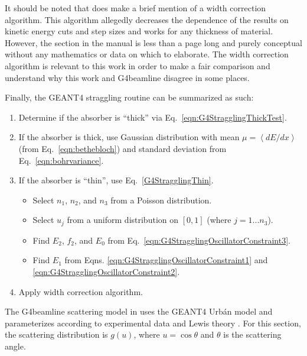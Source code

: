 It should be noted that \cite{geant4} does make a brief mention of a width correction algorithm. This algorithm allegedly decreases the dependence of the results on kinetic energy cuts and step sizes and works for any thickness of material. However, the section in the manual is less than a page long and purely conceptual without any mathematics or data on which to elaborate. The width correction algorithm is relevant to this work in order to make a fair comparison and understand why this work and G4beamline disagree in some places.

Finally, the GEANT4 straggling routine can be summarized as such:
\begin{enumerate}
\item{Determine if the absorber is ``thick'' via Eq.~\eqref{eqn:G4StragglingThickTest}.}
\item{If the absorber is thick, use Gaussian distribution with mean $\mu = \left<dE/dx\right>$ (from Eq.~\eqref{eqn:bethebloch}) and standard deviation from Eq.~\eqref{eqn:bohrvariance}.}
\item{If the absorber is ``thin'', use Eq.~\eqref{G4StragglingThin}.
	\begin{itemize}
	\item{Select $n_1$, $n_2$, and $n_3$ from a Poisson distribution.}
	\item{Select $u_j$ from a uniform distribution on $[0,1]$ (where $j=1...n_3$).}
	\item{Find $E_2$, $f_2$, and $E_0$ from Eq.~\eqref{eqn:G4StragglingOscillatorConstraint3}.} 
	\item{Find $E_1$ from Eqns. \ref{eqn:G4StragglingOscillatorConstraint1} and \ref{eqn:G4StragglingOscillatorConstraint2}.}
	\end{itemize}
	}
\item{Apply width correction algorithm.}
\end{enumerate}
 \label{sec:g4blscattering}\par
The G4beamline scattering model in \cite{g4bl} uses the GEANT4 Urb\'{a}n model \cite{geant4} and parameterizes according to experimental data and Lewis theory \cite{lewis}. For this section, the scattering distribution is $g(u)$, where $u=\cos\theta$ and $\theta$ is the scattering angle.

